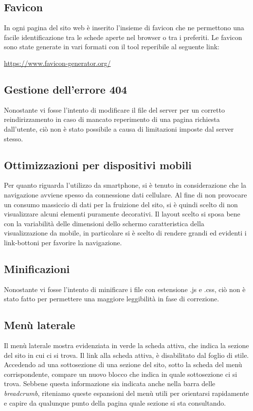 \documentclass[12pt]{article}
\begin{document}
	\subsection{Favicon}
	In ogni pagina del sito web è inserito l'insieme di favicon che ne permettono una facile identificazione tra le schede aperte nel browser o tra i preferiti. Le favicon sono state generate in vari formati con il tool reperibile al seguente link:

	\begin{center}
		\url{https://www.favicon-generator.org/}
	\end{center}

	\subsection{Gestione dell'errore 404}
	Nonostante vi fosse l'intento di modificare il file  del server per un corretto reindirizzamento in caso di mancato reperimento di una pagina richiesta dall'utente, ciò non è stato possibile a causa di limitazioni imposte dal server stesso.

	\subsection{Ottimizzazioni per dispositivi mobili}
	Per quanto riguarda l'utilizzo da smartphone, si è tenuto in considerazione che la navigazione avviene spesso da connessione dati cellulare. Al fine di non provocare un consumo massiccio di dati per la fruizione del sito, si è quindi scelto di non visualizzare alcuni elementi puramente decorativi. Il layout scelto si sposa bene con la variabilità delle dimensioni dello schermo caratteristica della visualizzazione da mobile, in particolare si è scelto di rendere grandi ed evidenti i link-bottoni per favorire la navigazione. 
	
	\subsection{Minificazioni}
	Nonostante vi fosse l'intento di minificare i file con estensione .js e .css, ciò non è stato fatto per permettere una maggiore leggibilità in fase di correzione.
	
	\subsection{Menù laterale} \label{ssec:menuusab}
	Il menù laterale mostra evidenziata in verde la scheda attiva, che indica la sezione del sito in cui ci si trova. Il link alla scheda attiva, è disabilitato dal foglio di stile. Accedendo ad una sottosezione di una sezione del sito, sotto la scheda del menù corrispondente, compare un nuovo blocco che indica in quale sottosezione ci si trova. Sebbene questa informazione sia indicata anche nella barra delle \textit{breadcrumb}, riteniamo queste espansioni del menù utili per orientarsi rapidamente e capire da qualunque punto della pagina quale sezione si sta consultando.
	
\end{document}
